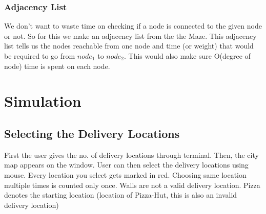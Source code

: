 \documentclass{article}
\begin{document}
\subsubsection{Adjacency List}
We don't want to waste time on checking if a node is connected to the given node or not. So for this we make an adjacency list from the the Maze. This adjacency list tells us the nodes reachable from one node and time (or weight) that would be required to go from $node_1$ to $node_2$. This would also make sure O(degree of node) time is spent on each node.

\section{Simulation}
\subsection{Selecting the Delivery Locations}
First the user gives the no. of delivery locations through terminal. Then, the city map appears on the window. User can then select the delivery locations using mouse. Every location you select gets marked in red. Choosing same location multiple times is counted only once. Walls are not a valid delivery location. Pizza denotes the starting location (location of Pizza-Hut, this is also an invalid delivery location)
\begin{figure}[H]
     \centering
\end{figure}
\end{document}
